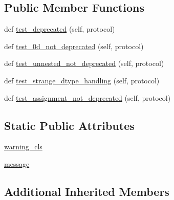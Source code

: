 \subsection*{Public Member Functions}
\begin{DoxyCompactItemize}
\item 
def \hyperlink{classnumpy_1_1core_1_1tests_1_1test__deprecations_1_1TestFutureWarningArrayLikeNotIterable_a6a844ecf2f038ada20eb331f83e27bbd}{test\+\_\+deprecated} (self, protocol)
\item 
def \hyperlink{classnumpy_1_1core_1_1tests_1_1test__deprecations_1_1TestFutureWarningArrayLikeNotIterable_a2d6636023b8ede6fdaea2a2459540275}{test\+\_\+0d\+\_\+not\+\_\+deprecated} (self, protocol)
\item 
def \hyperlink{classnumpy_1_1core_1_1tests_1_1test__deprecations_1_1TestFutureWarningArrayLikeNotIterable_a9f67eed3af119900cd9a45215bbef733}{test\+\_\+unnested\+\_\+not\+\_\+deprecated} (self, protocol)
\item 
def \hyperlink{classnumpy_1_1core_1_1tests_1_1test__deprecations_1_1TestFutureWarningArrayLikeNotIterable_aded9d99b6fff4163df7f0d54ed064001}{test\+\_\+strange\+\_\+dtype\+\_\+handling} (self, protocol)
\item 
def \hyperlink{classnumpy_1_1core_1_1tests_1_1test__deprecations_1_1TestFutureWarningArrayLikeNotIterable_a37248f5e86c14fbf0ec1c522dfd2b5b6}{test\+\_\+assignment\+\_\+not\+\_\+deprecated} (self, protocol)
\end{DoxyCompactItemize}
\subsection*{Static Public Attributes}
\begin{DoxyCompactItemize}
\item 
\hyperlink{classnumpy_1_1core_1_1tests_1_1test__deprecations_1_1TestFutureWarningArrayLikeNotIterable_ac9f63ca72b8eacdf23bb9a8846398997}{warning\+\_\+cls}
\item 
\hyperlink{classnumpy_1_1core_1_1tests_1_1test__deprecations_1_1TestFutureWarningArrayLikeNotIterable_a50ca80b0685c5f65edac0ae75886f6e5}{message}
\end{DoxyCompactItemize}
\subsection*{Additional Inherited Members}


